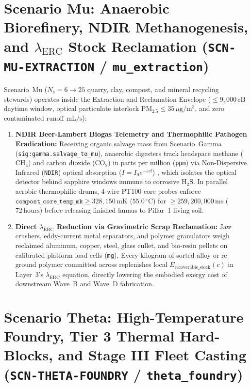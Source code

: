 \section{Scenario Mu: Anaerobic Biorefinery, NDIR Methanogenesis, and $\lambda_{\mathrm{ERC}}$ Stock Reclamation (\texttt{SCN-MU-EXTRACTION} / \texttt{mu\_extraction})}
\label{sec:l2-wave-d-mu}

Scenario~Mu ($N_s = 6 \to 25$ quarry, clay, compost, and mineral recycling stewards) operates inside the Extraction and Reclamation Envelope ($\le 9{,}000\,\mathrm{cB}$ daytime window, optical particulate interlock $\mathrm{PM}_{2.5} \le 35\,\mu\mathrm{g/m^3}$, and zero contaminated runoff $\mathrm{mL/s}$):
\begin{enumerate}
    \item \textbf{NDIR Beer-Lambert Biogas Telemetry and Thermophilic Pathogen Eradication:} Receiving organic salvage mass from Scenario~Gamma (\texttt{sig:gamma.salvage\_to\_mu}), anaerobic digesters track headspace methane ($\mathrm{CH_4}$) and carbon dioxide ($\mathrm{CO_2}$) in parts per million (\texttt{ppm}) via Non-Dispersive Infrared (\texttt{NDIR}) optical absorption ($I = I_0 e^{-\varepsilon c l}$) \parencite{hodgkinson2013non}, which isolates the optical detector behind sapphire windows immune to corrosive $\mathrm{H_2S}$. In parallel aerobic thermophilic drums, 4-wire PT100 core probes enforce $\mathtt{compost\_core\_temp\_mk} \ge 328{,}150\,\mathrm{mK}$ ($55.0\,^\circ\mathrm{C}$) for $\ge 259{,}200{,}000\,\mathrm{ms}$ ($72\,\mathrm{hours}$) before releasing finished humus to Pillar~1 living soil.
    \item \textbf{Direct $\lambda_{\mathrm{ERC}}$ Reduction via Gravimetric Scrap Reclamation:} Jaw crushers, eddy-current metal separators, and polymer granulators weigh reclaimed aluminum, copper, steel, glass cullet, and bio-resin pellets on calibrated platform load cells (\texttt{mg}). Every kilogram of sorted alloy or re-ground polymer committed across  replenishes local $E_{\mathrm{recoverable\_stock}}(c)$ in Layer~3's $\lambda_{\mathrm{ERC}}$ equation, directly lowering the embodied exergy cost of downstream Wave~B and Wave~D fabrication.
\end{enumerate}

\section{Scenario Theta: High-Temperature Foundry, Tier 3 Thermal Hard-Blocks, and Stage III Fleet Casting (\texttt{SCN-THETA-FOUNDRY} / \texttt{theta\_foundry})}
\label{sec:l2-wave-d-theta}

